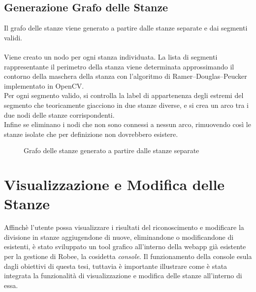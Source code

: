 \subsection{Generazione Grafo delle Stanze}
Il grafo delle stanze viene generato a partire dalle stanze separate e dai segmenti validi.\\\\
Viene creato un nodo per ogni stanza individuata. La lista di segmenti rappresentante il perimetro della stanza viene determinata approssimando il contorno della maschera della stanza con l'algoritmo di Ramer–Douglas–Peucker implementato in OpenCV.\\
Per ogni segmento valido, si controlla la label di appartenenza degli estremi del segmento che teoricamente giacciono in due stanze diverse, e si crea un arco tra i due nodi delle stanze corrispondenti. \\
Infine se eliminano i nodi che non sono connessi a nessun arco, rimuovendo così le stanze isolate che per definizione non dovrebbero esistere.
\begin{figure}[H]
  \centering
  \caption{Grafo delle stanze generato a partire dalle stanze separate}
\end{figure}
\section{Visualizzazione e Modifica delle Stanze}
Affinchè l'utente possa visualizzare i risultati del riconoscimento e modificare la divisione in stanze aggiugendone di nuove, eliminandone o modificandone di esistenti, è stato sviluppato un tool grafico all'interno della webapp già esistente per la gestione di Robee, la cosidetta \textit{console}. Il funzionamento della console esula dagli obiettivi di questa tesi, tuttavia è importante illustrare come è stata integrata la funzionalità di visualizzazione e modifica delle stanze all'interno di essa.
